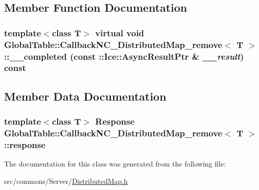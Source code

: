 \subsection{Member Function Documentation}
\hypertarget{class_global_table_1_1_callback_n_c___distributed_map__remove_a71122f6737ab3b9dd3a63730503b2264}{
\subsubsection[{\_\-\_\-completed}]{\setlength{\rightskip}{0pt plus 5cm}template$<$class T$>$ virtual void {\bf GlobalTable::CallbackNC\_\-DistributedMap\_\-remove}$<$ T $>$::\_\-\_\-completed (const ::Ice::AsyncResultPtr \& {\em \_\-\_\-result}) const}}
\label{class_global_table_1_1_callback_n_c___distributed_map__remove_a71122f6737ab3b9dd3a63730503b2264}


\subsection{Member Data Documentation}
\hypertarget{class_global_table_1_1_callback_n_c___distributed_map__remove_a53f8e4b9c2bbc86922abd8cda98dda03}{
\subsubsection[{response}]{\setlength{\rightskip}{0pt plus 5cm}template$<$class T$>$ {\bf Response} {\bf GlobalTable::CallbackNC\_\-DistributedMap\_\-remove}$<$ T $>$::{\bf response}}}
\label{class_global_table_1_1_callback_n_c___distributed_map__remove_a53f8e4b9c2bbc86922abd8cda98dda03}


The documentation for this class was generated from the following file:\begin{DoxyCompactItemize}
\item 
src/commons/Server/\hyperlink{_distributed_map_8h}{DistributedMap.h}\end{DoxyCompactItemize}
